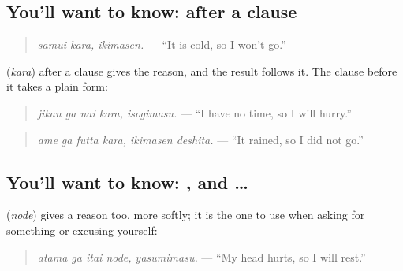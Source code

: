 \subsection*{You'll want to know:  after a clause}
\begin{quote}
\textbf{}
\end{quote}

\begin{quote}
\emph{samui kara, ikimasen.} — \textquotedblleft{}It is cold, so I won't go.\textquotedblright{}
\end{quote}

\textbf{} (\emph{kara}) after a clause gives the reason, and the result follows it. The clause before it takes a plain form:

\begin{quote}
\textbf{ }
\end{quote}

\begin{quote}
\emph{jikan ga nai kara, isogimasu.} — \textquotedblleft{}I have no time, so I will hurry.\textquotedblright{}
\end{quote}

\begin{quote}
\textbf{ }
\end{quote}

\begin{quote}
\emph{ame ga futta kara, ikimasen deshita.} — \textquotedblleft{}It rained, so I did not go.\textquotedblright{}
\end{quote}

\subsection*{You'll want to know: , and  …}
\textbf{} (\emph{node}) gives a reason too, more softly; it is the one to use when asking for something or excusing yourself:

\begin{quote}
\textbf{ }
\end{quote}

\begin{quote}
\emph{atama ga itai node, yasumimasu.} — \textquotedblleft{}My head hurts, so I will rest.\textquotedblright{}
\end{quote}

